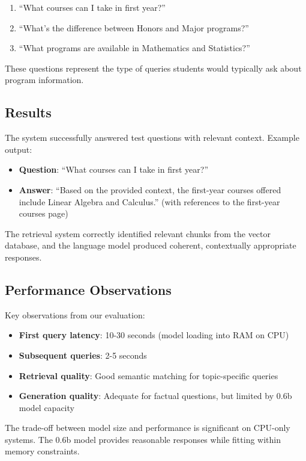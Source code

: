 \documentclass[conference]{IEEEtran}
\begin{document}
\begin{enumerate}
    \item ``What courses can I take in first year?''
    \item ``What's the difference between Honors and Major programs?''
    \item ``What programs are available in Mathematics and Statistics?''
\end{enumerate}

These questions represent the type of queries students would typically ask about program information.

\subsection{Results}
The system successfully answered test questions with relevant context. Example output:

\begin{itemize}
    \item \textbf{Question}: ``What courses can I take in first year?''
    \item \textbf{Answer}: ``Based on the provided context, the first-year courses offered include Linear Algebra and Calculus.'' (with references to the first-year courses page)
\end{itemize}

The retrieval system correctly identified relevant chunks from the vector database, and the language model produced coherent, contextually appropriate responses.

\subsection{Performance Observations}
Key observations from our evaluation:

\begin{itemize}
    \item \textbf{First query latency}: 10-30 seconds (model loading into RAM on CPU)
    \item \textbf{Subsequent queries}: 2-5 seconds
    \item \textbf{Retrieval quality}: Good semantic matching for topic-specific queries
    \item \textbf{Generation quality}: Adequate for factual questions, but limited by 0.6b model capacity
\end{itemize}

The trade-off between model size and performance is significant on CPU-only systems. The 0.6b model provides reasonable responses while fitting within memory constraints.
\end{document}
